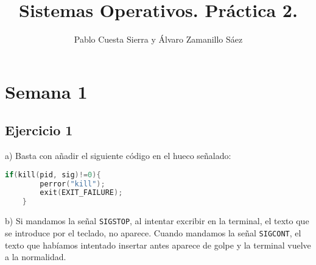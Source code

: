 \documentclass{article}
\title{Sistemas Operativos. Práctica 2.}
\author{Pablo Cuesta Sierra y Álvaro Zamanillo Sáez}
\begin{document}
\maketitle


\section*{Semana 1}

\subsection*{Ejercicio 1}

a) Basta con añadir el siguiente código en el hueco señalado: 
\begin{lstlisting}[language=C]
    if(kill(pid, sig)!=0){
        perror("kill");
        exit(EXIT_FAILURE);
    }
\end{lstlisting}

b) Si mandamos la señal \texttt{SIGSTOP}, al intentar excribir en la terminal, el texto que se introduce por el teclado, no aparece. Cuando mandamos la señal \texttt{SIGCONT}, el texto que habíamos intentado insertar antes aparece de golpe y la terminal vuelve a la normalidad.
\end{document}
